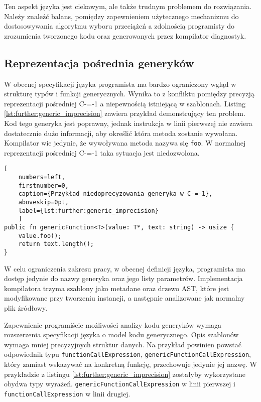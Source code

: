 Ten aspekt języka jest ciekawym, ale także trudnym problemem do rozwiązania.
Należy znaleźć balans, pomiędzy zapewnieniem użytecznego mechanizmu do dostosowywania algorytmu wyboru przeciążeń a zdolnością programisty do zrozumienia tworzonego kodu oraz generowanych przez kompilator diagnostyk.

\subsection{Reprezentacja pośrednia generyków}
\label{further:generic_intermidiate_representation}

W obecnej specyfikacji języka programista ma bardzo ograniczony wgląd w strukturę typów i funkcji generycznych.
Wynika to z konfliktu pomiędzy precyzją reprezentacji pośredniej C-=-1 a niepewnością istniejącą w szablonach.
Listing \ref{lst:further:generic_imprecision} zawiera przykład demonstrujący ten problem.
Kod tego generyka jest poprawny, jednak instrukcja w linii pierwszej nie zawiera dostatecznie dużo informacji, aby określić która metoda zostanie wywołana.
Kompilator wie jedynie, że wywoływana metoda nazywa się \lstinline{foo}.
W normalnej reprezentacji pośredniej C-=-1 taka sytuacja jest niedozwolona.
\begin{lstlisting}[
	numbers=left,
	firstnumber=0,
	caption={Przykład niedoprecyzowania generyka w C-=-1},
	aboveskip=0pt,
	label={lst:further:generic_imprecision}
	]
public fn genericFunction<T>(value: T*, text: string) -> usize {
	value.foo();
	return text.length();
}

\end{lstlisting}

W celu ograniczenia zakresu pracy, w obecnej definicji języka, programista ma dostęp jedynie do nazwy generyka oraz jego listy parametrów.
Implementacja kompilatora trzyma szablony jako metadane oraz drzewo AST, które jest modyfikowane przy tworzeniu instancji, a następnie analizowane jak normalny plik źródłowy.

Zapewnienie programiście możliwości analizy kodu generyków wymaga rozszerzenia specyfikacji języka o model kodu generycznego.
Opis szablonów wymaga mniej precyzyjnych struktur danych.
Na przykład powinien powstać odpowiednik typu \lstinline{functionCallExpression}, \lstinline{genericFunctionCallExpression}, który zamiast wskazywać na konkretną funkcję, przechowuje jedynie jej nazwę.
W przykładzie z listingu \ref{lst:further:generic_imprecision} zostałyby wykorzystane obydwa typy wyrażeń.
\lstinline{genericFunctionCallExpression} w linii pierwszej i \lstinline{functionCallExpression} w linii drugiej.
